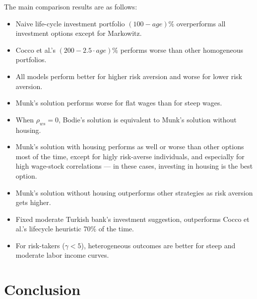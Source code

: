 \documentclass[]{elsarticle}
\begin{document}
The main comparison results are as follows:

\begin{itemize}

\item Naive life-cycle investment portfolio $(100-age)\%$ overperforms all investment options except for Markowitz.
\item Cocco et al.'s $(200-2.5\cdot age)\%$ performs worse than other homogeneous portfolios.
\item All models perform better for higher risk aversion and worse for lower risk aversion.
\item Munk's solution performs worse for flat wages than for steep wages.
\item When $\rho_{ws}=0$, Bodie's solution is equivalent to Munk's solution without housing.
\item Munk's solution with housing performs as well or worse than other options most of the time, except for higly risk-averse individuals, and especially for high wage-stock correlations --- in these cases, investing in housing is the best option. 
\item Munk's solution without housing outperforms other strategies as risk aversion gets higher.
\item Fixed moderate Turkish bank's investment suggestion, outperforms Cocco et al.'s lifecycle heuristic 70\% of the time.
\item For risk-takers ($\gamma < 5$), heterogeneous outcomes are better for steep and moderate labor income curves.
\end{itemize}


\section{Conclusion}
\label{conclusion}
\end{document}
